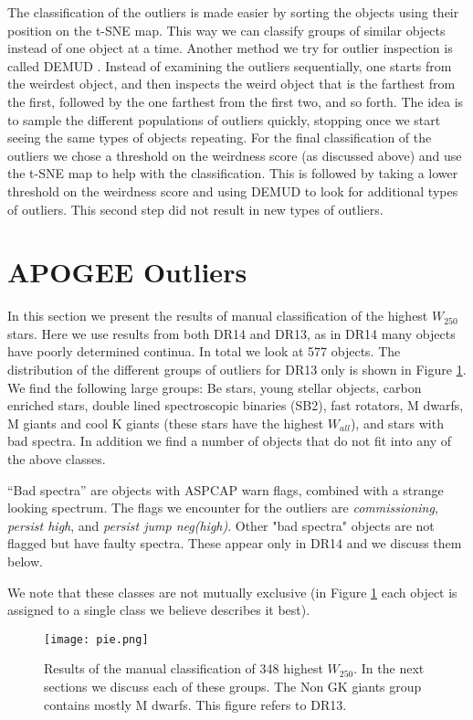 \documentclass[fleqn,usenatbib]{mnras}
\begin{document}
The classification of the outliers is made easier by sorting the objects using their position on the t-SNE map. This way we can classify groups of similar objects instead of one object at a time. Another method we try for outlier inspection is called DEMUD \citep{wagstaff13}. Instead of examining the outliers sequentially, one starts from the weirdest object, and then inspects the weird object that is the farthest from the first, followed by the one farthest from the first two, and so forth. The idea is to sample the different populations of outliers quickly, stopping once we start seeing the same types of objects repeating. For the final classification of the outliers we chose a threshold on the weirdness score (as discussed above) and use the t-SNE map to help with the classification. This is followed by taking a lower threshold on the weirdness score and using DEMUD to look for additional types of outliers. This second step did not result in new types of outliers.


\section{APOGEE Outliers}
\label{resultssec}
In this section we present the results of manual classification of the highest $W_{250}$ stars. Here we use results from both DR14 and DR13, as in DR14 many objects have poorly determined continua. In total we look at 577 objects. The distribution of the different groups of outliers for DR13 only is shown in Figure \ref{fig:outclass}. We find the following large groups: 
Be stars,
young stellar objects,
carbon enriched stars,
 double lined spectroscopic binaries (SB2),
 fast rotators, 
 M dwarfs,
 M giants and cool K giants (these stars have the highest $W_{all}$), 
 and stars with bad spectra.
 In addition we find a number of objects that do not fit into any of the above classes.

``Bad spectra'' are objects with ASPCAP warn flags, combined with a strange looking spectrum. The flags we encounter for the outliers are \textit{commissioning}, \textit{persist high}, and \textit{persist jump neg(high)}. Other "bad spectra" objects are not flagged but have faulty spectra. These appear only in DR14 and we discuss them below.

We note that these classes are not mutually exclusive (in Figure \ref{fig:outclass} each object is assigned to a single class we believe describes it best). 


\begin{figure}
  \begin{center}
  \texttt{[image: pie.png]}
  \caption{Results of the manual classification of 348 highest $W_{250}$. In the next sections we discuss each of these groups. The Non GK giants group contains mostly M dwarfs. This figure refers to DR13.}
  \label{fig:outclass}
  \end{center}
\end{figure}
\end{document}
